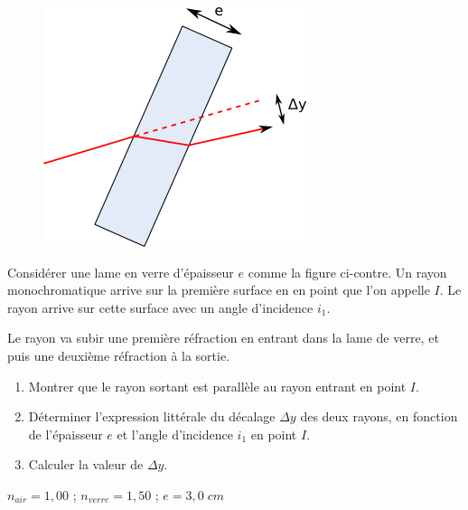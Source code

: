 \documentclass[11pt,a4paper]{article}
\begin{document}
\begingroup
\setlength{\intextsep}{0pt}%
\setlength{\columnsep}{0pt}%
\begin{figure}
    \centering
    \includegraphics[width=.95\linewidth]{refraction/BeamTranslation.png}
\end{figure}

Considérer une lame en verre d'épaisseur $e$ comme la figure ci-contre. Un rayon monochromatique arrive sur la première surface en en point que l'on appelle $I$. Le rayon arrive sur cette surface avec un angle d'incidence $i_1$. 

Le rayon va subir une première réfraction en entrant dans la lame de verre, et puis une deuxième réfraction à la sortie. 

\begin{enumerate}
    \item Montrer que le rayon sortant est parallèle au rayon entrant en point $I$. 
    \item Déterminer l'expression littérale du décalage $\Delta y$ des deux rayons, en fonction de l'épaisseur $e$ et l'angle d'incidence $i_1$ en point $I$. 
    \item Calculer la valeur de $\Delta y$. 
\end{enumerate}

\begin{tcolorbox}[title=Données]
$n_{air}=1,00$  \quad ; \quad  $n_{verre}=1,50$  \quad ; \quad $e=3,0\; cm$
\end{tcolorbox}
\end{document}
